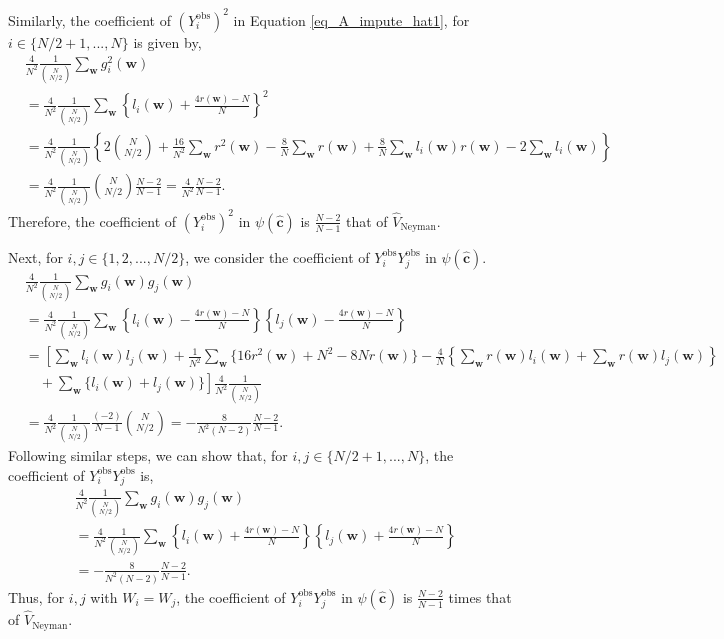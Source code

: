 \documentclass[12pt]{article}
\begin{document}
Similarly, the coefficient of $(Y^{\text{obs}}_i)^2$ in Equation \ref{eq_A_impute_hat1}, for $i \in \{N/2+1,...,N\}$ is given by,
\begin{align}
   & \frac{4}{N^2}\frac{1}{\binom{N}{N/2}} \sum_{\bm{w}}g^2_i(\bm{w}) \nonumber\\
   & = \frac{4}{N^2}\frac{1}{\binom{N}{N/2}}\sum_{\bm{w}}\left\{l_i(\bm{w}) + \frac{4r(\bm{w})-N}{N}   \right\}^2 \nonumber\\
    & = \frac{4}{N^2}\frac{1}{\binom{N}{N/2}}\left\{2\binom{N}{N/2} + \frac{16}{N^2}\sum_{\bm{w}}r^2(\bm{w}) - \frac{8}{N}\sum_{\bm{w}}r(\bm{w}) + \frac{8}{N}\sum_{\bm{w}}l_i(\bm{w})r(\bm{w}) - 2\sum_{\bm{w}}l_i(\bm{w})\right\} \nonumber \\
    & =  \frac{4}{N^2}\frac{1}{\binom{N}{N/2}} \binom{N}{N/2}\frac{N-2}{N-1} = \frac{4}{N^2}\frac{N-2}{N-1}.
\end{align}
Therefore, the coefficient of $(Y^{\text{obs}}_i)^2$ in $\psi(\hat{\bm{c}})$ is $\frac{N-2}{N-1}$ that of $\hat{V}_{\text{Neyman}}$.

Next, for $i,j \in \{1,2,...,N/2\}$, we consider the coefficient of $Y^{\text{obs}}_iY^{\text{obs}}_j$ in $\psi(\hat{\bm{c}})$.
\begin{align}
 &\frac{4}{N^2}\frac{1}{\binom{N}{N/2}}\sum_{\bm{w}} g_i(\bm{w})g_j(\bm{w}) \nonumber \\
 & = \frac{4}{N^2}\frac{1}{\binom{N}{N/2}}\sum_{\bm{w}}\left\{l_i(\bm{w}) - \frac{4r(\bm{w})-N}{N}   \right\}\left\{l_j(\bm{w}) - \frac{4r(\bm{w})-N}{N}   \right\} \nonumber \\
 & = \left[\sum_{\bm{w}}l_i(\bm{w})l_j(\bm{w}) + \frac{1}{N^2}\sum_{\bm{w}}\{16r^2(\bm{w}) + N^2 - 8Nr(\bm{w})\} - \frac{4}{N}\left\{\sum_{\bm{w}}r(\bm{w})l_i(\bm{w}) + \sum_{\bm{w}}r(\bm{w})l_j(\bm{w})\right\} \right. \nonumber \\
 &\quad + \left.\sum_{\bm{w}}\{l_i(\bm{w}) + l_j(\bm{w})\}\right]\frac{4}{N^2}\frac{1}{\binom{N}{N/2}} \nonumber \\
 & = \frac{4}{N^2}\frac{1}{\binom{N}{N/2}} \frac{(-2)}{N-1}\binom{N}{N/2} = -\frac{8}{N^2(N-2)}\frac{N-2}{N-1}.
\end{align}
Following similar steps, we can show that, for $i,j \in \{N/2+1,...,N\}$, the coefficient of $Y^{\text{obs}}_iY^{\text{obs}}_j$ is,
\begin{align}
    &\frac{4}{N^2}\frac{1}{\binom{N}{N/2}}\sum_{\bm{w}} g_i(\bm{w})g_j(\bm{w}) \nonumber \\
 & = \frac{4}{N^2}\frac{1}{\binom{N}{N/2}}\sum_{\bm{w}}\left\{l_i(\bm{w}) + \frac{4r(\bm{w})-N}{N}   \right\}\left\{l_j(\bm{w}) + \frac{4r(\bm{w})-N}{N}   \right\} \nonumber \\
 &= -\frac{8}{N^2(N-2)}\frac{N-2}{N-1}.
\end{align}
Thus, for $i,j$ with $W_i = W_j$, the coefficient of $Y^{\text{obs}}_iY^{\text{obs}}_j$ in $\psi(\hat{\bm{c}})$ is $\frac{N-2}{N-1}$ times that of $\hat{V}_{\text{Neyman}}$.
\end{document}
